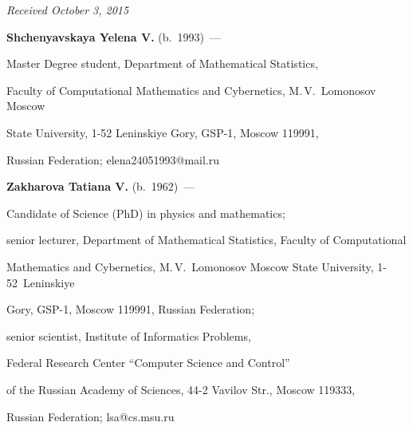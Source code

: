 \vspace*{-1pt}



\hfill{\small\textit{Received October 3, 2015}}





\Contr



\noindent

\textbf{Shchenyavskaya Yelena V.} (b.\ 1993)~---

   Master Degree student, Department of Mathematical Statistics, 

   Faculty of Computational Mathematics and Cybernetics, M.\,V.~Lomonosov Moscow 

   State University, 1-52 Leninskiye Gory, GSP-1, Moscow 119991, 

   Russian Federation; elena24051993@mail.ru

   

   \vspace*{3pt}

   

   

  \noindent

\textbf{Zakharova Tatiana V.} (b.\ 1962)~---  

Candidate of Science (PhD) in physics and mathematics; 

senior lecturer, Department of Mathematical Statistics, Faculty of Computational 

Mathematics and Cybernetics, M.\,V.~Lomonosov Moscow State University, 1-52~Leninskiye 

Gory, GSP-1, Moscow 119991, Russian Federation; 

senior scientist, Institute of Informatics Problems, 

Federal Research Center ``Computer Science and Control'' 

of the Russian Academy of Sciences, 44-2 Vavilov Str., Moscow 119333, 

Russian Federation; lsa@cs.msu.ru





 \label{end\stat}





\renewcommand{\bibname}{\protect\rm Литература}

